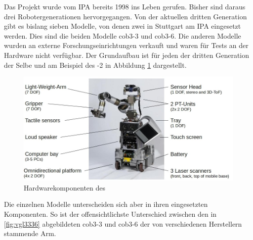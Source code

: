Das Projekt \cob wurde vom \ac{IPA} bereits 1998 ins Leben gerufen. Bisher sind
daraus drei Robotergenerationen hervorgegangen. Von der aktuellen dritten
Generation gibt es bislang sieben Modelle, von denen zwei in Stuttgart am \ac{IPA}
eingesetzt werden. Dies sind die beiden Modelle cob3-3 und cob3-6. Die anderen
Modelle wurden an externe Forschungseinrichtungen verkauft und waren für Tests
an der Hardware nicht verfügbar. Der Grundaufbau ist für jeden \cob der dritten
Generation der Selbe und am Beispiel des -2 in Abbildung \ref{setup} dargestellt.

\begin{figure}[Hht]
\centering
\includegraphics[width=\textwidth]{images/hw_setup_with_text}
\caption{Hardwarekomponenten des \cob}
\label{setup}
\end{figure}

  Die einzelnen Modelle unterscheiden sich aber in ihren
eingesetzten Komponenten. So ist der offensichtlichste Unterschied zwischen
den in \ref{fig:vgl3336} abgebildeten cob3-3 und cob3-6 der von verschiedenen Herstellern stammende Arm. 

